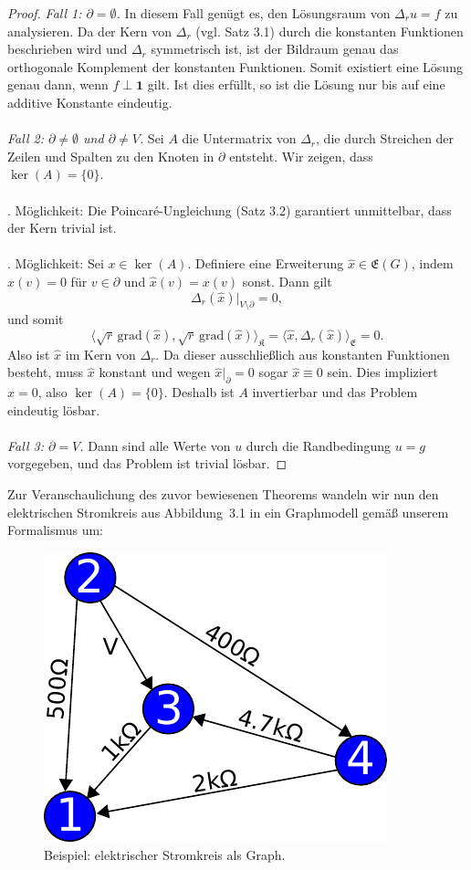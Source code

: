\documentclass[11pt,a4paper,leqno]{report}
\numberwithin{equation}{chapter}
\begin{document}
\begin{proof}
	\emph{Fall 1: $\partial = \emptyset$.}  
	In diesem Fall genügt es, den Lösungsraum von $\Delta_r u = f$ zu analysieren. 
	Da der Kern von $\Delta_r$ (vgl. Satz 3.1) durch die konstanten Funktionen beschrieben wird 
	und $\Delta_r$ symmetrisch ist, ist der Bildraum genau das orthogonale Komplement 
	der konstanten Funktionen. 
	Somit existiert eine Lösung genau dann, wenn $f \perp \mathbf{1}$ gilt. 
	Ist dies erfüllt, so ist die Lösung nur bis auf eine additive Konstante eindeutig.\\
	\\
	\medskip
	\emph{Fall 2: $\partial \neq \emptyset$ und $\partial \neq V$.}  
	Sei $A$ die Untermatrix von $\Delta_r$, die durch Streichen der Zeilen und Spalten 
	zu den Knoten in $\partial$ entsteht. 
	Wir zeigen, dass $\ker(A)=\{0\}$.  \\
	\\
	\quad{}. Möglichkeit:  
	Die Poincaré-Ungleichung (Satz 3.2) garantiert unmittelbar, 
	dass der Kern trivial ist.  \\
	\\
	\quad{}. Möglichkeit:  
	Sei $x \in \ker(A)$. 
	Definiere eine Erweiterung $\hat{x}\in \mathfrak{E}(G)$, 
	indem $\hat{x}(v)=0$ für $v\in\partial$ und $\hat{x}(v)=x(v)$ sonst. 
	Dann gilt 
	\[
	\Delta_r(\hat{x})|_{V\setminus \partial} = 0,
	\]
	und somit
	\[
	\langle \sqrt{r}\,\mathrm{grad}(\hat{x}), \sqrt{r}\,\mathrm{grad}(\hat{x})\rangle_{\mathfrak{K}}
	= \langle \hat{x}, \Delta_r(\hat{x})\rangle_{\mathfrak{E}}
	= 0.
	\]
	Also ist $\hat{x}$ im Kern von $\Delta_r$. 
	Da dieser ausschließlich aus konstanten Funktionen besteht, 
	muss $\hat{x}$ konstant und wegen $\hat{x}|_\partial = 0$ sogar $\hat{x}\equiv 0$ sein. 
	Dies impliziert $x=0$, also $\ker(A)=\{0\}$.  
	Deshalb ist $A$ invertierbar und das Problem eindeutig lösbar.\\
	\\
	\medskip
	\emph{Fall 3: $\partial=V$.}  
	Dann sind alle Werte von $u$ durch die Randbedingung $u=g$ vorgegeben, 
	und das Problem ist trivial lösbar.
\end{proof}
\noindent
Zur Veranschaulichung des zuvor bewiesenen Theorems 
wandeln wir nun den elektrischen Stromkreis aus Abbildung~3.1 
in ein Graphmodell gemäß unserem Formalismus um:
\begin{figure}[H]
	\centering
	\includegraphics[scale=0.6]{Abbildungen/elektro.pdf}
	\caption{Beispiel: elektrischer Stromkreis als Graph.}
\end{figure}
\end{document}
